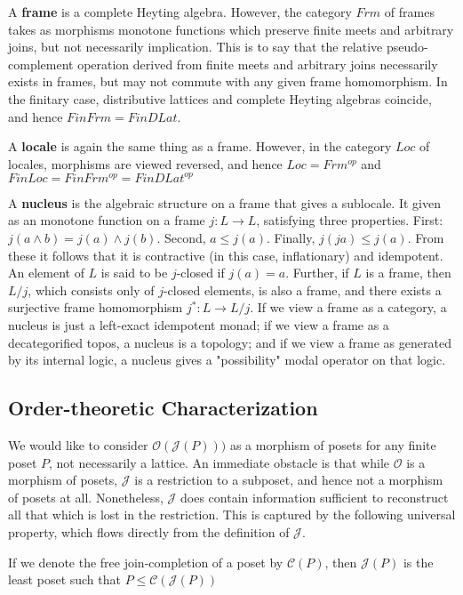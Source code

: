\documentclass[hoptionsi,review,format=sigplan]{acmart}
\theoremstyle{definition}
\newcommand{\Oc}{\mathcal{O}}
\newcommand{\Jc}{\mathcal{J}}
\newcommand{\Cc}{\mathcal{C}}
\begin{document}
A \textbf{frame} is a complete Heyting algebra. However, the category \(Frm\) of frames takes as morphisms monotone functions which preserve finite meets and arbitrary joins, but not necessarily implication. This is to say that the relative pseudo-complement operation derived from finite meets and arbitrary joins necessarily exists in frames, but may not commute with any given frame homomorphism. In the finitary case, distributive lattices and complete Heyting algebras coincide, and hence \(FinFrm = FinDLat\).

A \textbf{locale} is again the same thing as a frame. However, in the category \(Loc\) of locales, morphisms are viewed reversed, and hence \(Loc = Frm^{op}\) and \(FinLoc = FinFrm^{op} = FinDLat^{op}\)

A \textbf{nucleus} is the algebraic structure on a frame that gives a sublocale. It given as an monotone function on a frame \(j : L \rightarrow L\), satisfying three properties. First: \(j(a \wedge b) = j(a) \wedge j(b)\). Second, \(a \le j(a)\). Finally, \(j(ja) \le j(a)\). From these it follows that it is contractive (in this case, inflationary) and idempotent. An element of \(L\) is said to be \(j\)-closed if \(j(a)=a\). Further, if \(L\) is a frame, then \(L/j\), which consists only of \(j\)-closed elements, is also a frame, and there exists a surjective frame homomorphism \(j^* : L \rightarrow L/j\). If we view a frame as a category, a nucleus is just a left-exact idempotent monad; if we view a frame as a decategorified topos, a nucleus is a topology; and if we view a frame as generated by its internal logic, a nucleus gives a "possibility" modal operator on that logic.

\subsection{Order-theoretic Characterization}

We would like to consider \(\Oc(\Jc(P)))\) as a morphism of posets for any finite poset \(P\), not necessarily a lattice. An immediate obstacle is that while \(\Oc\) is a morphism of posets, \(\Jc\) is a restriction to a subposet, and hence not a morphism of posets at all. Nonetheless, \(\Jc\) does contain information sufficient to reconstruct all that which is lost in the restriction. This is captured by the following universal property, which flows directly from the definition of \(\Jc\).

\begin{lemma}
If we denote the free join-completion of a poset by \(\Cc(P)\), then \(\Jc(P)\) is the least poset such that \(P \le \Cc(\Jc(P))\)
\end{lemma}
\end{document}
